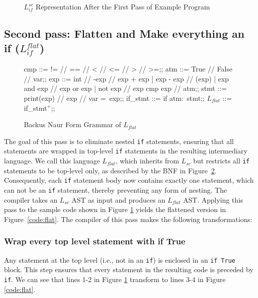 \begin{figure}[h]
	\centering
	
	\caption{$L_{if}^{sc}$ Representation After the First Pass of Example Program}
	\label{code:sc}
\end{figure}


\subsection{Second pass: Flatten and Make everything an if ($L_{if}^{flat}$)} \label{subsec:flatten}
\begin{figure}[h!]
	\centering
	\begin{bnf}[row{-} = {bg = gray9}]
		cmp ::= != // == // < // <= // > // >=;;
		atm ::= True // False // var;;
		exp ::= int  // -exp // exp + exp 
		| exp - exp // (exp)
		| exp and exp // exp or exp 
		| not exp // exp cmp exp // atm;;
		stmt ::= print(exp) // exp // var = exp;;
		if\_stmt ::= if atm$\colon$ stmt;;
		$L_{flat}$ ::= if\_stmt$^+$;;
	\end{bnf}
	\caption{Backus Naur Form Grammar of $L_{flat}$}
	\label{bnf:flat}
\end{figure}

The goal of this pass is to eliminate nested \texttt{if} statements, ensuring that all statements are wrapped in top-level \texttt{if} statements in the resulting intermediary language. We call this language $L_{flat}$, which inherits from $L_{sc}$ but restricts all \texttt{if} statements to be top-level only, as described by the BNF in Figure~\ref{bnf:flat}. Consequently, each \texttt{if} statement body now contains exactly one statement, which can not be an \texttt{if} statement, thereby preventing any form of nesting. The compiler takes an $L_{sc}$ AST as input and produces an $L_{flat}$ AST. Applying this pass to the sample code shown in Figure \ref{code:sc} yields the flattened version in Figure~\ref{code:flat}. The compiler of this pass makes the following transformations:

\subsubsection{Wrap every top level statement with if True} Any statement at the top level (i.e., not in an \texttt{if}) is enclosed in an \texttt{if True} block. This step ensures that every statement in the resulting code is preceded by \texttt{if}. We can see that lines 1-2 in Figure \ref{code:sc} transform to lines 3-4 in Figure \ref{code:flat}.

